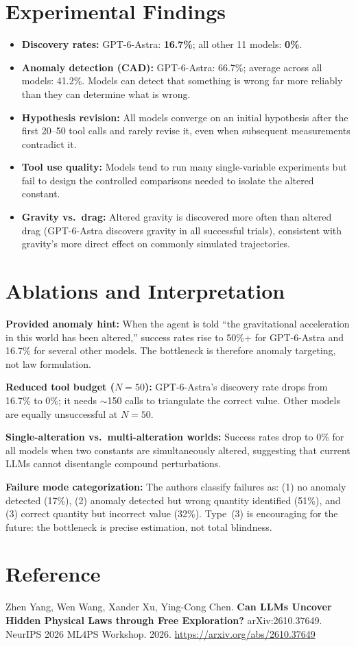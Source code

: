 \documentclass[10pt,twocolumn]{article}
\begin{document}
\section{Experimental Findings}

\begin{itemize}[itemsep=2pt,parsep=0pt]
  \item \textbf{Discovery rates:} GPT-6-Astra: \textbf{16.7\%};
    all other 11 models: \textbf{0\%}.
  \item \textbf{Anomaly detection (CAD):} GPT-6-Astra: 66.7\%;
    average across all models: 41.2\%. Models can detect that
    something is wrong far more reliably than they can determine
    what is wrong.
  \item \textbf{Hypothesis revision:} All models converge on an
    initial hypothesis after the first 20--50 tool calls and rarely
    revise it, even when subsequent measurements contradict it.
  \item \textbf{Tool use quality:} Models tend to run many
    single-variable experiments but fail to design the
    controlled comparisons needed to isolate the altered constant.
  \item \textbf{Gravity vs.\ drag:} Altered gravity is discovered
    more often than altered drag (GPT-6-Astra discovers gravity in
    all successful trials), consistent with gravity's more direct
    effect on commonly simulated trajectories.
\end{itemize}

\section{Ablations and Interpretation}

\textbf{Provided anomaly hint:}
When the agent is told ``the gravitational acceleration in this world
has been altered,'' success rates rise to 50\%+ for GPT-6-Astra and
16.7\% for several other models. The bottleneck is therefore anomaly
targeting, not law formulation.

\textbf{Reduced tool budget ($N = 50$):}
GPT-6-Astra's discovery rate drops from 16.7\% to 0\%; it needs
$\sim$150 calls to triangulate the correct value. Other models
are equally unsuccessful at $N = 50$.

\textbf{Single-alteration vs.\ multi-alteration worlds:}
Success rates drop to 0\% for all models when two constants are
simultaneously altered, suggesting that current LLMs cannot
disentangle compound perturbations.

\textbf{Failure mode categorization:}
The authors classify failures as: (1) no anomaly detected (17\%),
(2) anomaly detected but wrong quantity identified (51\%), and
(3) correct quantity but incorrect value (32\%). Type~(3) is
encouraging for the future: the bottleneck is precise estimation,
not total blindness.

\section*{Reference}

Zhen Yang, Wen Wang, Xander Xu, Ying-Cong Chen.
\textbf{Can LLMs Uncover Hidden Physical Laws through Free Exploration?}
arXiv:2610.37649. NeurIPS 2026 ML4PS Workshop. 2026.
\url{https://arxiv.org/abs/2610.37649}
\end{document}
